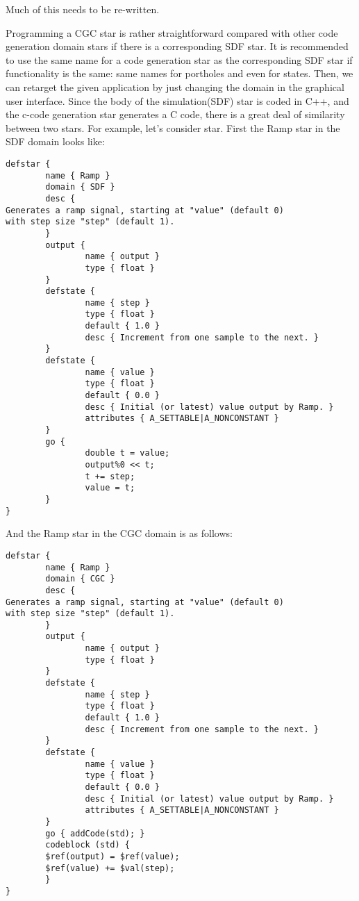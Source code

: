 \begin{ignore}
\comment Much of this needs to be re-written.

Programming a CGC star is rather straightforward compared with other
code generation domain stars if there is a corresponding 
SDF star. It is recommended to use the same name for a code generation
star as the corresponding SDF star if functionality is the same:
same names for portholes and even for states. Then, we can retarget the
given application by just changing the domain in the graphical user
interface. Since the body of the simulation(SDF) star is coded in C++, and
the c-code generation star generates a C code, there is a great deal of
similarity between two stars. For example, let's consider
star. First the Ramp star in the SDF domain looks like:

\begin{verbatim}
defstar {
        name { Ramp }
        domain { SDF }
        desc {
Generates a ramp signal, starting at "value" (default 0)
with step size "step" (default 1).
        }
        output {
                name { output }
                type { float }
        }
        defstate {
                name { step }
                type { float }
                default { 1.0 }
                desc { Increment from one sample to the next. }
        }
        defstate {
                name { value }
                type { float }
                default { 0.0 }
                desc { Initial (or latest) value output by Ramp. }
                attributes { A_SETTABLE|A_NONCONSTANT }
        }
        go {
                double t = value;
                output%0 << t;
                t += step;
                value = t;
        }
}
\end{verbatim}

And the Ramp star in the CGC domain is as follows:

\begin{verbatim}
defstar {
        name { Ramp }
        domain { CGC }
        desc {
Generates a ramp signal, starting at "value" (default 0)
with step size "step" (default 1).
        }
        output {
                name { output }
                type { float }
        }
        defstate {
                name { step }
                type { float }
                default { 1.0 }
                desc { Increment from one sample to the next. }
        }
        defstate {
                name { value }
                type { float }
                default { 0.0 }
                desc { Initial (or latest) value output by Ramp. }
                attributes { A_SETTABLE|A_NONCONSTANT }
        }
        go { addCode(std); }
        codeblock (std) {
        $ref(output) = $ref(value);
        $ref(value) += $val(step);
        }
}
\end{verbatim}


\end{ignore}
